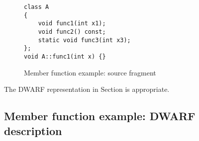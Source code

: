 \begin{figure}[here]
\begin{lstlisting}
class A
{
    void func1(int x1);
    void func2() const;
    static void func3(int x3);
};
void A::func1(int x) {}
\end{lstlisting}
\caption{Member function example: source fragment} \label{fig:memberfunctionexamplesourcefragment}
\end{figure}



The DWARF representation in 
Section 
is appropriate.

\subsection{Member function example: DWARF description}
\label{app:memberfunctionexampledwarfdescription}


